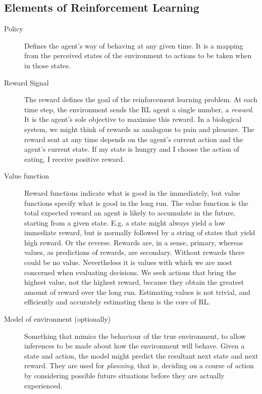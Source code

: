 \subsection{Elements of Reinforcement Learning}
\begin{description}
	\item[Policy] Defines the agent's way of behaving at any given time. It is a mapping from the perceived states of the environment to actions to be taken when in those states.
	\item[Reward Signal] The reward defines the goal of the reinforcement learning problem. At each time step, the environment sends the RL agent a single number, a \textit{reward}. It is the agent's sole objective to maximise this reward. In a biological system, we might think of rewards as analogous to pain and pleasure. The reward sent at any time depends on the agent's current action and the agent's current state. If my state is hungry and I choose the action of eating, I receive positive reward.
	\item[Value function] Reward functions indicate what is good in the immediately, but value functions specify what is good in the long run. The value function is the total expected reward an agent is likely to accumulate in the future, starting from a given state. E.g. a state might always yield a low immediate reward, but is normally followed by a string of states that yield high reward. Or the reverse. Rewards are, in a sense, primary, whereas values, as predictions of rewards, are secondary. Without rewards there could be no value. Nevertheless it is values with which we are most concerned when evaluating decisions. We seek actions that bring the highest value, not the highest reward, because they obtain the greatest amount of reward over the long run. Estimating values is not trivial, and efficiently and accurately estimating them is the core of RL.
	\item[Model of environment (optionally)] Something that mimics the behaviour of the true environment, to allow inferences to be made about how the environment will behave. Given a state and action, the model might predict the resultant next state and next reward. They are used for \textit{planning}, that is, deciding on a course of action by considering possible future situations before they are actually experienced. 
\end{description}

	
	
	
	
